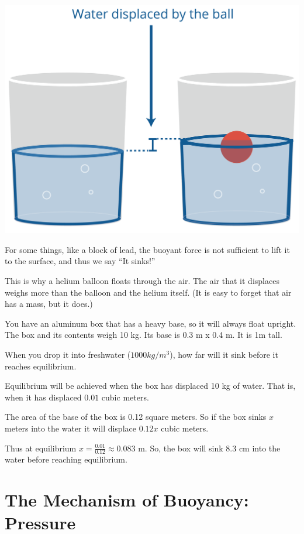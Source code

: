 \includegraphics[width=.7\textwidth]{waterDisplacement.png}

For some things, like a block of lead, the buoyant force is not
 sufficient to lift it to the surface, and thus we say ``It sinks!''

This is why a helium balloon floats through the air. The air
that it displaces weighs more than the balloon and the helium itself. (It is easy to forget that air has a mass, but it does.)

\begin{Exercise}[title={Buoyancy}, label=buoyancy]
  You have an aluminum box that has a heavy base, so it will always
  float upright. The box and its contents weigh 10 kg. Its base is 0.3 m x 0.4 m. It is 1m tall.

  When you drop it into freshwater ($1000 kg/m^3$), how far will it sink
  before it reaches equilibrium.
  
\end{Exercise}
\begin{Answer}[ref=buoyancy]
  Equilibrium will be achieved when the box has displaced 10 kg of water. That is, when it has displaced $0.01$ cubic meters.

  The area of the base of the box is 0.12 square meters.  So if the
  box sinks $x$ meters into the water it will displace $0.12 x$ cubic
  meters.

  Thus at equilibrium $x = \frac{0.01}{0.12} \approx 0.083$ m.  So,
  the box will sink 8.3 cm into the water before reaching equilibrium.
\end{Answer}

\section{The Mechanism of Buoyancy: Pressure}

